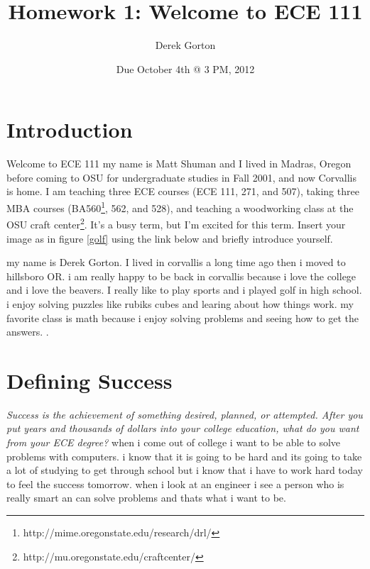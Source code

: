 \documentclass{article}
\title{Homework 1: Welcome to ECE 111}
\author{Derek Gorton}
\date{Due October 4th @ 3 PM, 2012}
\begin{document}
 
\maketitle

\section{Introduction}
Welcome to ECE 111 my name is Matt Shuman and I lived in Madras, Oregon before coming to OSU for undergraduate studies in Fall 2001, and now Corvallis is home.  I am teaching three ECE courses (ECE 111, 271, and 507), taking three MBA courses (BA560\footnote{http://mime.oregonstate.edu/research/drl/}, 562, and 528), and teaching a woodworking class at the OSU craft center\footnote{http://mu.oregonstate.edu/craftcenter/}.  It's a busy term, but I'm excited for this term. Insert your image as in figure \ref{golf} using the link below and briefly introduce yourself.
\newline
\newline

my name is Derek Gorton. I lived in corvallis a long time ago then i moved to hillsboro OR. i am really happy to be back in corvallis because i love the college and i love the beavers. I really like to play sports and i played golf in high school. i enjoy solving puzzles like rubiks cubes and learing about how things work. my favorite class is math because i enjoy solving problems and seeing how to get the answers.
.  
\section{Defining Success}
\emph{Success is the achievement of something desired, planned, or attempted. After you put years and thousands of dollars into your 
college education, what do you want from your ECE degree?}
\newline\newline
when i come out of college i want to be able to solve problems with computers. i know that it is going to be hard and its going to take a lot of studying to get through school but i know that i have to work hard today to feel the success tomorrow. when i look at an engineer i see a person who is really smart an can solve problems and thats what i want to be.
\end{document}
